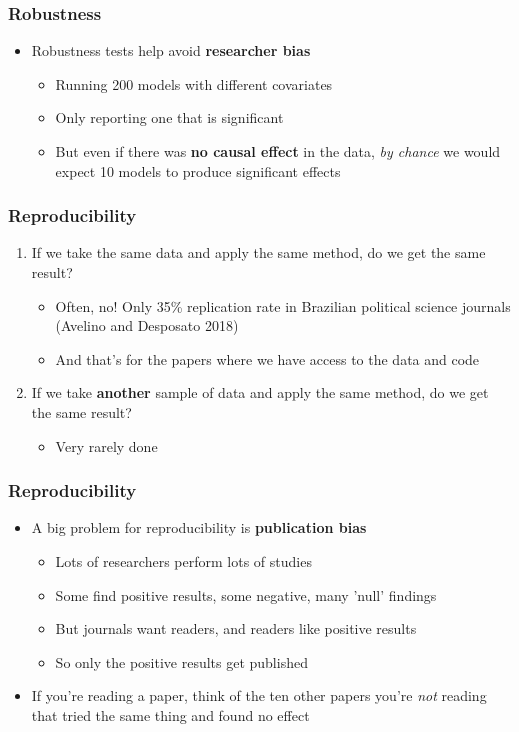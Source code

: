 \documentclass[xcolor=x11names,compress]{beamer}\usepackage[]{graphicx}\usepackage[]{color}
\renewcommand{\(}{\begin{columns}}
\renewcommand{\)}{\end{columns}}
\newcommand{\<}[1]{\begin{column}{#1}}
\renewcommand{\>}{\end{column}}
\begin{document}
\begin{frame}
\frametitle{Robustness}
\begin{itemize}
\item Robustness tests help avoid \textbf{researcher bias}
\pause
\begin{itemize}
\item Running 200 models with different covariates
\pause
\item Only reporting one that is significant
\pause
\item But even if there was \textbf{no causal effect} in the data, \textit{by chance} we would expect 10 models to produce significant effects
\end{itemize}
\end{itemize}
\end{frame}


\begin{frame}
\frametitle{Reproducibility}
\begin{enumerate}
\item If we take the same data and apply the same method, do we get the same result?
\pause
\begin{itemize}
\item Often, no! Only 35\% replication rate in Brazilian political science journals (Avelino and Desposato 2018)
\pause
\item And that's for the papers where we have access to the data and code
\pause
\end{itemize}
\item If we take \textbf{another} sample of data and apply the same method, do we get the same result?
\begin{itemize}
\item Very rarely done
\end{itemize}
\end{enumerate}
\end{frame}

\begin{frame}
\frametitle{Reproducibility}
\begin{itemize}
\item A big problem for reproducibility is \textbf{publication bias}
\pause
\begin{itemize}
\item Lots of researchers perform lots of studies
\pause
\item Some find positive results, some negative, many 'null' findings
\pause
\item But journals want readers, and readers like positive results
\pause
\item So only the positive results get published
\pause
\end{itemize}
\item If you're reading a paper, think of the ten other papers you're \textit{not} reading that tried the same thing and found no effect
\end{itemize}
\end{frame}
\end{document}
